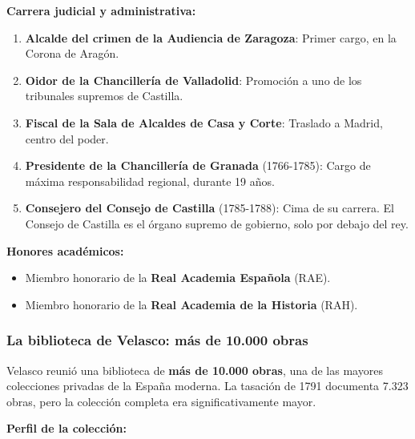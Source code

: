 \documentclass[11pt,a4paper]{article}
\begin{document}
\textbf{Carrera judicial y administrativa:}

\begin{enumerate}
\item \textbf{Alcalde del crimen de la Audiencia de Zaragoza}: Primer cargo, en la Corona de Aragón.
\item \textbf{Oidor de la Chancillería de Valladolid}: Promoción a uno de los tribunales supremos de Castilla.
\item \textbf{Fiscal de la Sala de Alcaldes de Casa y Corte}: Traslado a Madrid, centro del poder.
\item \textbf{Presidente de la Chancillería de Granada} (1766-1785): Cargo de máxima responsabilidad regional, durante 19 años.
\item \textbf{Consejero del Consejo de Castilla} (1785-1788): Cima de su carrera. El Consejo de Castilla es el órgano supremo de gobierno, solo por debajo del rey.
\end{enumerate}

\textbf{Honores académicos:}

\begin{itemize}
\item Miembro honorario de la \textbf{Real Academia Española} (RAE).
\item Miembro honorario de la \textbf{Real Academia de la Historia} (RAH).
\end{itemize}

\subsubsection{La biblioteca de Velasco: más de 10.000 obras}

Velasco reunió una biblioteca de \textbf{más de 10.000 obras}, una de las mayores colecciones privadas de la España moderna. La tasación de 1791 documenta 7.323 obras, pero la colección completa era significativamente mayor.

\textbf{Perfil de la colección:}
\end{document}
